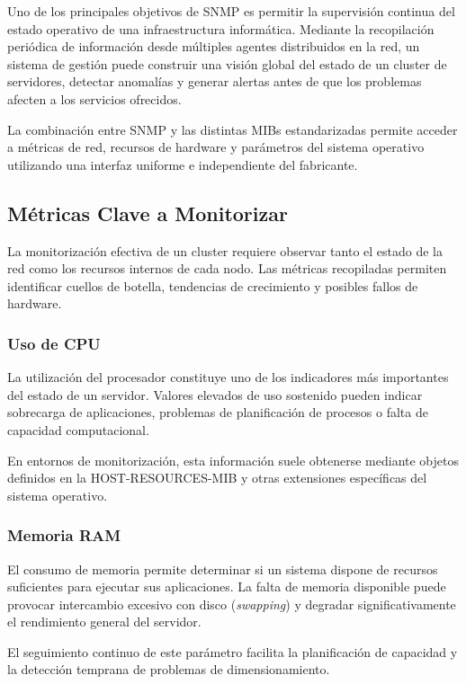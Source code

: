 Uno de los principales objetivos de SNMP es permitir la supervisión continua del estado operativo de una infraestructura informática. Mediante la recopilación periódica de información desde múltiples agentes distribuidos en la red, un sistema de gestión puede construir una visión global del estado de un cluster de servidores, detectar anomalías y generar alertas antes de que los problemas afecten a los servicios ofrecidos.

La combinación entre SNMP y las distintas MIBs estandarizadas permite acceder a métricas de red, recursos de hardware y parámetros del sistema operativo utilizando una interfaz uniforme e independiente del fabricante.

\subsection{Métricas Clave a Monitorizar}

La monitorización efectiva de un cluster requiere observar tanto el estado de la red como los recursos internos de cada nodo. Las métricas recopiladas permiten identificar cuellos de botella, tendencias de crecimiento y posibles fallos de hardware.

\subsubsection{Uso de CPU}

La utilización del procesador constituye uno de los indicadores más importantes del estado de un servidor. Valores elevados de uso sostenido pueden indicar sobrecarga de aplicaciones, problemas de planificación de procesos o falta de capacidad computacional.

En entornos de monitorización, esta información suele obtenerse mediante objetos definidos en la HOST-RESOURCES-MIB y otras extensiones específicas del sistema operativo.

\subsubsection{Memoria RAM}

El consumo de memoria permite determinar si un sistema dispone de recursos suficientes para ejecutar sus aplicaciones. La falta de memoria disponible puede provocar intercambio excesivo con disco (\textit{swapping}) y degradar significativamente el rendimiento general del servidor.

El seguimiento continuo de este parámetro facilita la planificación de capacidad y la detección temprana de problemas de dimensionamiento.

